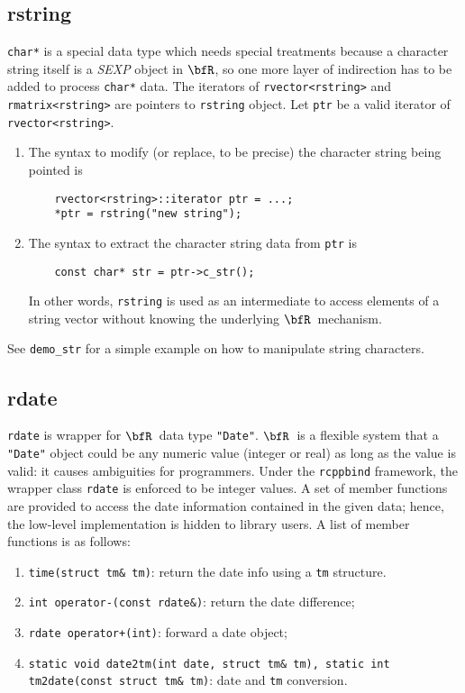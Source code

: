 \documentclass{article}
\newcommand{\R}{$\bfR$}
\begin{document}
\subsection{rstring}

\texttt{char*} is a special data type which needs special
treatments because a character string itself is a
\textsl{SEXP} object in \R, so one more layer of indirection
has to be added to process \texttt{char*} data. The iterators
of \texttt{rvector<rstring>} and \texttt{rmatrix<rstring>}
are pointers to \texttt{rstring} object. Let \texttt{ptr} be
a valid iterator of \texttt{rvector<rstring>}. 
\begin{enumerate}
  \item The syntax to modify (or replace, to be precise) the
    character string being pointed is
    \begin{lstlisting}
    rvector<rstring>::iterator ptr = ...;
    *ptr = rstring("new string");
    \end{lstlisting}
  \item The syntax to extract the character string data from
    \texttt{ptr} is
    \begin{lstlisting}
    const char* str = ptr->c_str();
    \end{lstlisting}
    In other words, \texttt{rstring} is used as an
    intermediate to access elements of a string vector
    without knowing the underlying \R\ mechanism.
\end{enumerate}
See \texttt{demo\_str} for a simple example on how to
manipulate string characters.

\subsection{rdate}

\texttt{rdate} is wrapper for \R\ data type \texttt{"Date"}.
\R\ is a flexible system that a \texttt{"Date"} object could
be any numeric value (integer or real) as long as the value
is valid: it causes ambiguities for programmers.  Under the
\texttt{rcppbind} framework, the wrapper class \texttt{rdate}
is enforced to be integer values. A set of member functions
are provided to access the date information contained in the
given data; hence, the low-level implementation is hidden to
library users. A list of member functions is as follows:
\begin{enumerate}
  \item \texttt{time(struct tm\& tm)}: return the date info
    using a \texttt{tm} structure.
  \item \texttt{int operator-(const rdate\&)}: return the date difference;
  \item \texttt{rdate operator+(int)}: forward a date object;
  \item \texttt{static void date2tm(int date, struct tm\& tm),
    static int tm2date(const struct tm\& tm)}: date and
    \texttt{tm} conversion.
\end{enumerate}
 
\end{document}

